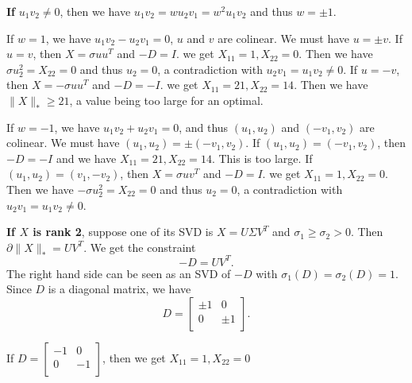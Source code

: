 \textbf{If} $u_1v_2\ne0$,
then we have $u_1v_2=wu_2v_1=w^2u_1v_2$
and thus $w=\pm1$.

If $w=1$,
we have $u_1v_2-u_2v_1=0$,
\ie $u$ and $v$ are colinear.
We must have $u=\pm v$.
If $u=v$,
then $X=\sigma uu^T$ and $-D=I$.
we get $X_{11}=1, X_{22}=0$.
Then we have $\sigma u_2^2=X_{22}=0$
and thus $u_2=0$,
a contradiction with $u_2v_1=u_1v_2\ne0$.
If $u=-v$,
then $X=-\sigma uu^T$ and $-D=-I$.
we get $X_{11}=21, X_{22}=14$.
Then we have $\|X\|_*\ge21$,
a value being too large for an optimal.

If $w=-1$,
we have $u_1v_2+u_2v_1=0$,
and thus $(u_1,u_2)$ and $(-v_1,v_2)$ are colinear.
We must have $(u_1,u_2)=\pm(-v_1,v_2)$.
If $(u_1,u_2)=(-v_1,v_2)$,
then $-D=-I$ and we have $X_{11}=21, X_{22}=14$.
This is too large.
If $(u_1,u_2)=(v_1,-v_2)$,
then $X=\sigma uv^T$ and $-D=I$.
we get $X_{11}=1, X_{22}=0$.
Then we have $-\sigma u_2^2=X_{22}=0$
and thus $u_2=0$,
a contradiction with $u_2v_1=u_1v_2\ne0$.

\textbf{If $X$ is rank 2},
suppose one of its SVD is $X=U\Sigma V^T$
and $\sigma_1\ge\sigma_2>0$.
Then $\partial\|X\|_*=UV^T$.
We get the constraint
\begin{equation}
    -D=UV^T.
\end{equation}
The right hand side can be seen as an SVD of $-D$
with $\sigma_1(D)=\sigma_2(D)=1$.
Since $D$ is a diagonal matrix,
we have
\begin{equation}
    D=
    \begin{bmatrix}
        \pm1 & 0    \\
        0    & \pm1 \\
    \end{bmatrix}.
\end{equation}

If $D=
    \begin{bmatrix}
        -1 & 0    \\
        0    & -1 \\
    \end{bmatrix}$,
then we get $X_{11}=1, X_{22}=0$
